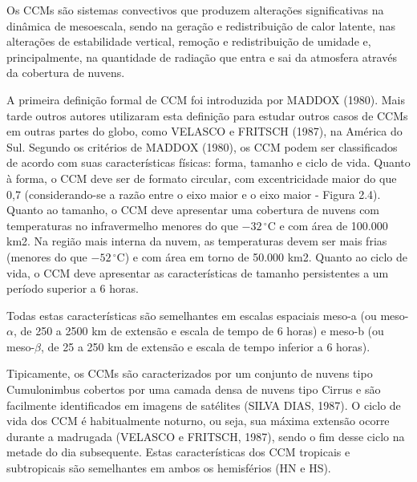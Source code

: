 Os CCMs são sistemas convectivos que produzem alterações significativas na dinâmica de mesoescala, sendo na geração e redistribuição de calor latente, nas alterações de estabilidade vertical, remoção e redistribuição de umidade e, principalmente, na quantidade de radiação que entra e sai da atmosfera através da cobertura de nuvens.

A primeira definição formal de CCM foi introduzida por MADDOX (1980). Mais tarde outros autores utilizaram esta definição para estudar outros casos de CCMs em outras partes do globo, como VELASCO e FRITSCH (1987), na América do Sul. Segundo os critérios de MADDOX (1980), os CCM podem ser classificados de acordo com suas características físicas: forma, tamanho e ciclo de vida. Quanto à forma, o CCM deve ser de formato circular, com excentricidade maior do que 0,7 (considerando-se a razão entre o eixo maior e o eixo maior - Figura 2.4). Quanto ao tamanho, o CCM deve apresentar uma cobertura de nuvens com temperaturas no infravermelho menores do que $-32\,^{\circ}\mathrm{C}$ e com área de 100.000 km2. Na região mais interna da nuvem, as temperaturas devem ser mais frias (menores do que $-52\,^{\circ}\mathrm{C}$) e com área em torno de 50.000 km2. Quanto ao ciclo de vida, o CCM deve apresentar as características de tamanho persistentes a um período superior a 6 horas.

Todas estas características são semelhantes em escalas espaciais meso-a (ou meso-$\alpha$, de 250 a 2500 km de extensão e escala de tempo de 6 horas) e meso-b (ou meso-$\beta$, de 25 a 250 km de extensão e escala de tempo inferior a 6 horas).

Tipicamente, os CCMs são caracterizados por um conjunto de nuvens tipo Cumulonimbus cobertos por uma camada densa de nuvens tipo Cirrus e são facilmente identificados em imagens de satélites (SILVA DIAS, 1987). O ciclo de vida dos CCM é habitualmente noturno, ou seja, sua máxima extensão ocorre durante a madrugada (VELASCO e FRITSCH, 1987), sendo o fim desse ciclo na metade do dia subsequente. Estas características dos CCM tropicais e subtropicais são semelhantes em ambos os hemisférios (HN e HS).

